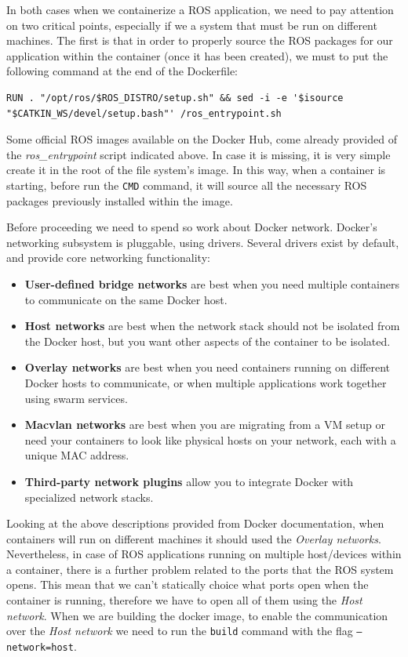 In both cases when we containerize a ROS application, we need to pay attention on two critical points, especially if we a system that must be run on different machines.
The first is that in order to properly source the ROS packages for our application within the container (once it has been created), we must to put the following command at the end of the Dockerfile:

\begin{verbatim}
RUN . "/opt/ros/$ROS_DISTRO/setup.sh" && sed -i -e '$isource "$CATKIN_WS/devel/setup.bash"' /ros_entrypoint.sh
\end{verbatim}


Some official ROS images available on the Docker Hub, come already provided of the \textit{ros\_entrypoint} script indicated above. In case it is missing, it is very simple create it in the root of the file system's image. In this way, when a container is starting, before run the \texttt{CMD} command, it will source all the necessary ROS packages previously installed within the image.

Before proceeding we need to spend so work about Docker network. Docker’s networking subsystem is pluggable, using drivers. Several drivers exist by default, and provide core networking functionality:
\begin{itemize}
	\item \textbf{User-defined bridge networks} are best when you need multiple containers to communicate on the same Docker host.
	\item \textbf{Host networks} are best when the network stack should not be isolated from the Docker host, but you want other aspects of the container to be isolated.
	\item \textbf{Overlay networks} are best when you need containers running on different Docker hosts to communicate, or when multiple applications work together using swarm services.
	\item \textbf{Macvlan networks} are best when you are migrating from a VM setup or need your containers to look like physical hosts on your network, each with a unique MAC address.
	\item \textbf{Third-party network plugins} allow you to integrate Docker with specialized network stacks.
\end{itemize}
Looking at the above descriptions provided from Docker documentation, when containers will run on different machines it should used the \textit{Overlay networks}. Nevertheless, in case of ROS applications running on multiple host/devices within a container, there is a further problem related to the ports that the ROS system opens. This mean that we can't statically choice what ports open when the container is running, therefore we have to open all of them using the \textit{Host network}.
When we are building the docker image, to enable the communication over the \textit{Host network} we need to run the \texttt{build} command with the flag \texttt{--network=host}.



